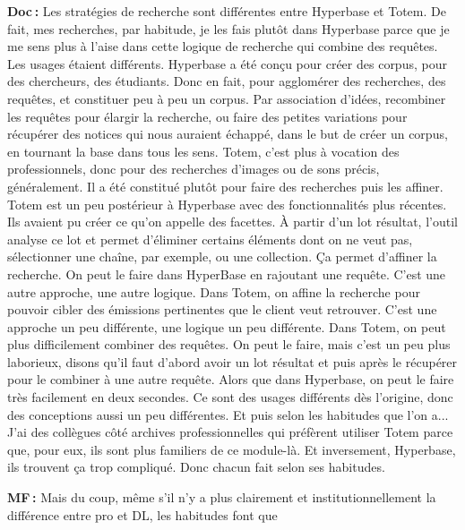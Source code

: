 \textbf{Doc :} Les stratégies de recherche sont différentes entre Hyperbase et Totem. De fait, mes recherches, par habitude, je les fais plutôt dans Hyperbase parce que je me sens plus à l'aise dans cette logique de recherche qui combine des requêtes. Les usages étaient différents.  Hyperbase a été conçu pour créer des corpus, pour des chercheurs, des étudiants. Donc en fait, pour agglomérer des recherches, des requêtes, et constituer peu à peu un corpus. Par association d'idées, recombiner les requêtes pour élargir la recherche, ou faire des petites variations pour récupérer des notices qui nous auraient échappé, dans le but de créer un corpus, en tournant la base dans tous les sens. Totem, c'est plus à vocation des professionnels, donc pour des recherches d'images ou de sons précis, généralement. Il a été constitué plutôt pour faire des recherches puis les affiner. Totem est un peu postérieur à Hyperbase avec des fonctionnalités plus récentes. Ils avaient pu créer ce qu'on appelle des facettes. À partir d'un lot résultat, l’outil analyse ce lot et permet d'éliminer certains éléments dont on ne veut pas, sélectionner une chaîne, par exemple, ou une collection. Ça permet d'affiner la recherche. On peut le faire dans HyperBase en rajoutant une requête. C'est une autre approche, une autre logique. Dans Totem, on affine la recherche pour pouvoir cibler des émissions pertinentes que le client veut retrouver. C'est une approche un peu différente, une logique un peu différente. Dans Totem, on peut plus difficilement combiner des requêtes. On peut le faire, mais c'est un peu plus laborieux, disons qu'il faut d'abord avoir un lot résultat et puis après le récupérer pour le combiner à une autre requête. Alors que dans Hyperbase, on peut le faire très facilement en deux secondes. Ce sont des usages différents dès l'origine, donc des conceptions aussi un peu différentes. Et puis selon les habitudes que l'on a... J'ai des collègues côté archives professionnelles qui préfèrent utiliser Totem parce que, pour eux, ils sont plus familiers de ce module-là. Et inversement, Hyperbase, ils trouvent ça trop compliqué. Donc chacun fait selon ses habitudes.

\textbf{MF :} Mais du coup, même s'il n'y a plus clairement et institutionnellement la différence entre pro et DL, les habitudes font que 

